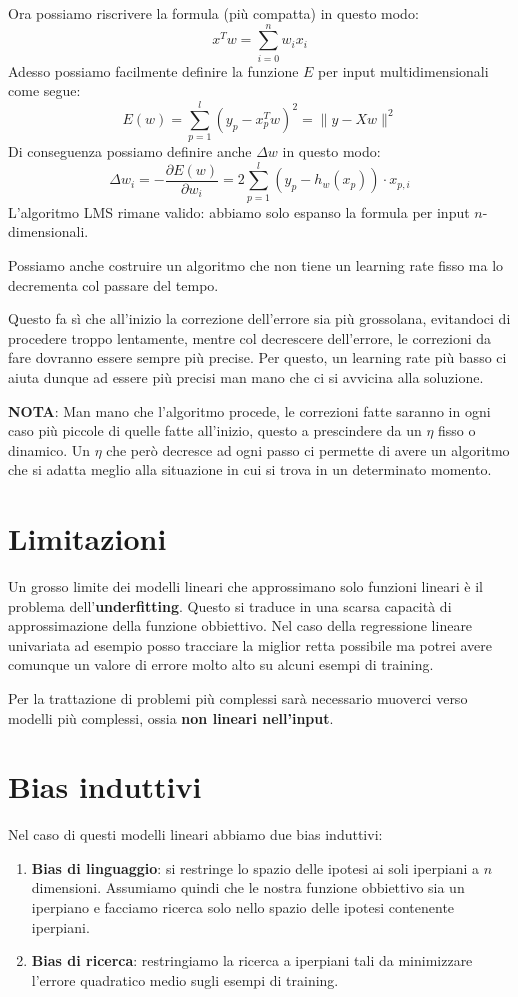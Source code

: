 Ora possiamo riscrivere la formula (pi\`u compatta) in questo modo:
\[ x^T w = \sum_{i=0}^n w_i x_i \]
Adesso possiamo facilmente definire la funzione $E$ per input multidimensionali come segue:
\[ E(w) = \sum_{p=1}^l (y_p - x^T_p w)^2 = \| y - X w \|^2 \]
Di conseguenza possiamo definire anche $\Delta w$ in questo modo:
\[ \Delta w_i = -\frac{\partial E(w)}{\partial w_i} = 2 \sum_{p=1}^l (y_p - h_w(x_p)) \cdot x_{p, i} \]
L'algoritmo LMS rimane valido: abbiamo solo espanso la formula per input $n$-dimensionali.

Possiamo anche costruire un algoritmo che non tiene un learning rate fisso ma lo decrementa col passare del tempo.

Questo fa s\`i che all'inizio la correzione dell'errore sia pi\`u grossolana, evitandoci di procedere troppo lentamente,
mentre col decrescere dell'errore, le correzioni da fare dovranno essere sempre pi\`u precise. Per questo, un learning
rate pi\`u basso ci aiuta dunque ad essere pi\`u precisi man mano che ci si avvicina alla soluzione.

\textbf{NOTA}: Man mano che l'algoritmo procede, le correzioni fatte saranno in ogni caso pi\`u piccole di quelle fatte
all'inizio, questo a prescindere da un $\eta$ fisso o dinamico. Un $\eta$ che per\`o decresce ad ogni passo ci permette di
avere un algoritmo che si adatta meglio alla situazione in cui si trova in un determinato momento.

\section{Limitazioni}
Un grosso limite dei modelli lineari che approssimano solo funzioni lineari \`e il problema dell'\textbf{underfitting}.
Questo si traduce in una scarsa capacit\`a di approssimazione della funzione obbiettivo. Nel caso della regressione
lineare univariata ad esempio posso tracciare la miglior retta possibile ma potrei avere comunque un valore di errore
molto alto su alcuni esempi di training.

Per la trattazione di problemi pi\`u complessi sar\`a necessario muoverci verso modelli pi\`u complessi, ossia
\textbf{non lineari nell'input}.

\section{Bias induttivi}
Nel caso di questi modelli lineari abbiamo due bias induttivi:
\begin{enumerate}
	\item \textbf{Bias di linguaggio}: si restringe lo spazio delle ipotesi ai soli iperpiani a
	      $n$ dimensioni. Assumiamo quindi che le nostra funzione obbiettivo sia un iperpiano e
	      facciamo ricerca solo nello spazio delle ipotesi contenente iperpiani.
	\item \textbf{Bias di ricerca}: restringiamo la ricerca a iperpiani tali da minimizzare l'errore quadratico
	      medio sugli esempi di training.
\end{enumerate}
